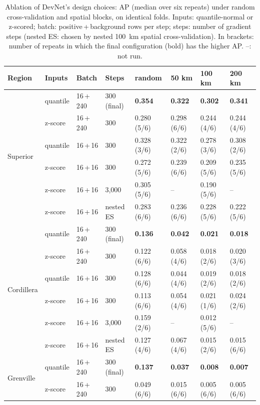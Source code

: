 \documentclass[pdflatex,sn-apa]{sn-jnl}
\begin{document}
\begin{appendices}
\begin{table}[!h]
\caption{Ablation of DevNet's design choices: AP (median over six repeats) under random cross-validation and spatial blocks, on identical folds. Inputs: quantile-normal or z-scored; batch: positive\,+\,background rows per step; steps: number of gradient steps (nested ES: chosen by nested 100~km spatial cross-validation). In brackets: number of repeats in which the final configuration (bold) has the higher AP. --: not run.}\label{tab:ablation}
\scriptsize
\setlength{\tabcolsep}{2.5pt}
\begin{tabular*}{\textwidth}{@{\extracolsep\fill}llllllll}
\toprule
Region & Inputs & Batch & Steps & random & 50 km & 100 km & 200 km \\
\midrule
\multirow{6}{*}{Superior} & quantile & 16\,+\,240 & 300 (final) & \textbf{0.354} & \textbf{0.322} & \textbf{0.302} & \textbf{0.341} \\
 & z-score & 16\,+\,240 & 300 & 0.280 (5/6) & 0.298 (6/6) & 0.244 (4/6) & 0.244 (4/6) \\
 & quantile & 16\,+\,16 & 300 & 0.328 (3/6) & 0.322 (2/6) & 0.278 (3/6) & 0.308 (2/6) \\
 & z-score & 16\,+\,16 & 300 & 0.272 (5/6) & 0.239 (6/6) & 0.209 (5/6) & 0.235 (5/6) \\
 & z-score & 16\,+\,16 & 3,000 & 0.305 (5/6) & -- & 0.190 (5/6) & -- \\
 & z-score & 16\,+\,16 & nested ES & 0.283 (6/6) & 0.236 (6/6) & 0.228 (5/6) & 0.222 (5/6) \\
\midrule
\multirow{6}{*}{Cordillera} & quantile & 16\,+\,240 & 300 (final) & \textbf{0.136} & \textbf{0.042} & \textbf{0.021} & \textbf{0.018} \\
 & z-score & 16\,+\,240 & 300 & 0.122 (6/6) & 0.058 (4/6) & 0.018 (2/6) & 0.020 (3/6) \\
 & quantile & 16\,+\,16 & 300 & 0.128 (6/6) & 0.044 (4/6) & 0.019 (2/6) & 0.018 (2/6) \\
 & z-score & 16\,+\,16 & 300 & 0.113 (6/6) & 0.054 (4/6) & 0.021 (1/6) & 0.024 (2/6) \\
 & z-score & 16\,+\,16 & 3,000 & 0.159 (2/6) & -- & 0.012 (5/6) & -- \\
 & z-score & 16\,+\,16 & nested ES & 0.127 (4/6) & 0.067 (4/6) & 0.015 (2/6) & 0.015 (6/6) \\
\midrule
\multirow{6}{*}{Grenville} & quantile & 16\,+\,240 & 300 (final) & \textbf{0.137} & \textbf{0.037} & \textbf{0.008} & \textbf{0.007} \\
 & z-score & 16\,+\,240 & 300 & 0.049 (6/6) & 0.015 (6/6) & 0.005 (6/6) & 0.005 (6/6) \\

\end{tabular*}
\end{table}
\end{appendices}
\end{document}
